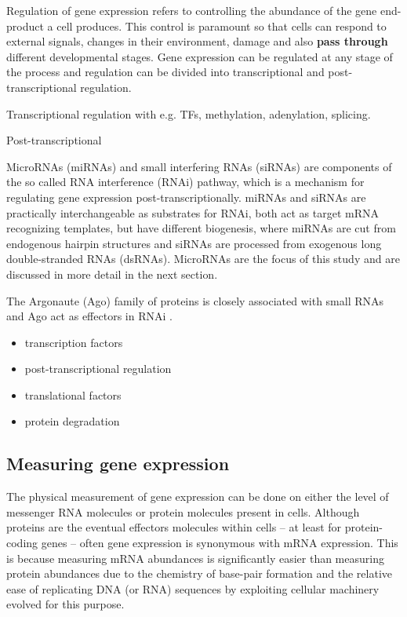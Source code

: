 Regulation of gene expression refers to controlling the abundance of
the gene end-product a cell produces. This control is paramount so that cells
can respond to external signals, changes in their environment, damage and also 
\textbf{pass through} different developmental stages. Gene expression can be regulated
at any stage of the process and regulation can be divided into transcriptional
and post-transcriptional regulation.

Transcriptional regulation with e.g. TFs, methylation, adenylation, splicing.

Post-transcriptional

MicroRNAs (miRNAs) and small interfering RNAs (siRNAs) are components of the
so called RNA interference (RNAi) pathway, which is a mechanism for regulating
gene expression post-transcriptionally. miRNAs and siRNAs are practically
interchangeable as substrates for RNAi, both act as target mRNA recognizing
templates, but have different biogenesis, where miRNAs are cut from endogenous hairpin
structures and siRNAs are processed from exogenous long double-stranded RNAs (dsRNAs).
\cite{Du2005} MicroRNAs are the focus of this study and are discussed in more
detail in the next section.

The Argonaute (Ago) family of proteins is closely associated with small RNAs and
Ago act as effectors in RNAi \cite{Ha2014}.

\begin{itemize}
  \item transcription factors
  \item post-transcriptional regulation
  \item translational factors
  \item protein degradation
\end{itemize}




\subsection{Measuring gene expression}\label{measurement-of-gene-expression}

The physical measurement of gene expression can be done on either the level of
messenger RNA molecules or protein molecules present in cells. Although
proteins are the eventual effectors molecules within cells -- at least for
protein-coding genes -- often gene expression is synonymous with mRNA
expression. This is because measuring mRNA abundances is significantly easier than
measuring protein abundances due to the chemistry of base-pair formation
and the relative ease of replicating DNA (or RNA) sequences by
exploiting cellular machinery evolved for this purpose.

